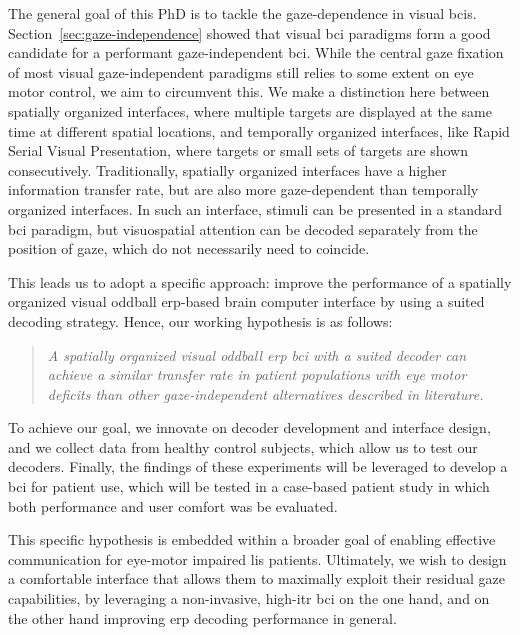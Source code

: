 The general goal of this PhD is to tackle the gaze-dependence in visual \ac{bci}s.
Section~\ref{sec:gaze-independence} showed that visual \ac{bci} paradigms form
a good candidate for a performant gaze-independent \ac{bci}.
While the central gaze fixation of most visual gaze-independent paradigms still
relies to some extent on eye motor control, we aim to circumvent this.
We make a distinction here between spatially organized interfaces, where
multiple targets are displayed at the same time at different spatial locations,
and temporally organized interfaces, like Rapid Serial Visual
Presentation,
where targets or small sets of targets are shown consecutively.
Traditionally, spatially organized interfaces have a higher information transfer
rate, but are also more gaze-dependent than temporally organized interfaces.
In such an interface, stimuli can be presented in a standard \ac{bci} paradigm, but
visuospatial attention can be decoded separately from the position of gaze,
which do not necessarily need to coincide.

This leads us to adopt a specific approach: improve the performance of a
spatially organized visual oddball \ac{erp}-based brain
computer interface by using a suited decoding strategy.
Hence, our working hypothesis is as follows:
\begin{quote}
	\textit{A spatially organized visual oddball \ac{erp} \ac{bci} with a suited decoder
		can achieve a similar transfer rate in patient
		populations with eye motor deficits than other gaze-independent alternatives
    described in literature.}
\end{quote}

To achieve our goal, we innovate on decoder development and interface design,
and we collect data from healthy control subjects, which allow us to test our decoders.
Finally, the findings of these experiments will be leveraged to develop a \ac{bci}
for patient use, which will be tested in a case-based patient study in which
both performance and user comfort was be evaluated.

This specific hypothesis is embedded within a broader goal of enabling
effective communication for eye-motor impaired \ac{lis} patients.
Ultimately, we wish to design a comfortable interface that allows them to maximally exploit
their residual gaze capabilities, by leveraging a non-invasive, high-\ac{itr}
\ac{bci} on the one hand, and on the other hand improving \ac{erp} decoding performance
in general.


